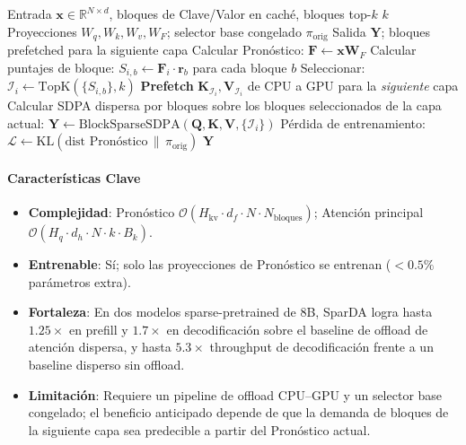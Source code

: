 \begin{algorithm}[H]
\caption{SparDA: Atención Dispersa Desacoplada con Prefetch de Pronóstico}
\begin{algorithmic}[1]
\Require Entrada $\mathbf{x} \in \mathbb{R}^{N \times d}$, bloques de Clave/Valor en caché, bloques top-$k$ $k$
\Require Proyecciones $W_q, W_k, W_v, W_F$; selector base congelado $\pi_{\text{orig}}$
\Ensure Salida $\mathbf{Y}$; bloques prefetched para la siguiente capa
\State Calcular Pronóstico: $\mathbf{F} \gets \mathbf{x} \mathbf{W}_F$ 
    \State Calcular puntajes de bloque: $S_{i,b} \gets \mathbf{F}_i \cdot \mathbf{r}_b$ para cada bloque $b$
    \State Seleccionar: $\mathcal{I}_i \gets \mathrm{TopK}(\{S_{i,b}\}, k)$
    \State \textbf{Prefetch} $\mathbf{K}_{\mathcal{I}_i}, \mathbf{V}_{\mathcal{I}_i}$ de CPU a GPU para la \emph{siguiente} capa 
\EndFor
\State Calcular SDPA dispersa por bloques sobre los bloques seleccionados de la capa actual: $\mathbf{Y} \gets \mathrm{BlockSparseSDPA}(\mathbf{Q}, \mathbf{K}, \mathbf{V}, \{\mathcal{I}_i\})$
\State Pérdida de entrenamiento: $\mathcal{L} \gets \mathrm{KL}(\text{dist Pronóstico} \,\|\, \pi_{\text{orig}})$ 
\Return $\mathbf{Y}$
\end{algorithmic}
\end{algorithm}

\paragraph{Características Clave}

\begin{itemize}[leftmargin=*]
    \item \textbf{Complejidad}: Pronóstico $\mathcal{O}(H_{\text{kv}} \cdot d_f \cdot N \cdot N_{\text{bloques}})$; Atención principal $\mathcal{O}(H_q \cdot d_h \cdot N \cdot k \cdot B_k)$.
    \item \textbf{Entrenable}: Sí; solo las proyecciones de Pronóstico se entrenan ($<0.5\%$ parámetros extra).
    \item \textbf{Fortaleza}: En dos modelos sparse-pretrained de 8B, SparDA logra hasta $1.25\times$ en prefill y $1.7\times$ en decodificación sobre el baseline de offload de atención dispersa, y hasta $5.3\times$ throughput de decodificación frente a un baseline disperso sin offload.
    \item \textbf{Limitación}: Requiere un pipeline de offload CPU--GPU y un selector base congelado; el beneficio anticipado depende de que la demanda de bloques de la siguiente capa sea predecible a partir del Pronóstico actual.
\end{itemize}

